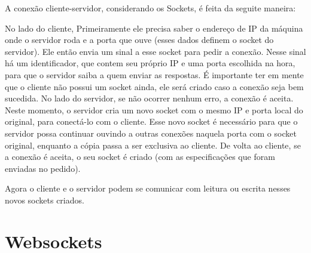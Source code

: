 \documentclass[a4paper,12pt]{article}
\begin{document}
A conexão cliente-servidor, considerando os Sockets, é feita da seguite maneira:

No lado do cliente, Primeiramente ele precisa saber o endereço de IP da máquina onde o servidor roda e a porta que ouve (esses dados definem o socket do servidor). Ele então envia um sinal a esse socket para pedir a conexão. Nesse sinal há um identificador, que contem seu próprio IP e uma porta escolhida na hora, para que o servidor saiba a quem enviar as respostas. É importante ter em mente que o cliente não possui um socket ainda, ele será criado caso a conexão seja bem sucedida.
No lado do servidor, se não ocorrer nenhum erro, a conexão é aceita. Neste momento, o servidor cria um novo socket com o mesmo IP e porta local do original, para conectá-lo com o cliente. Esse novo socket é necessário para que o servidor possa continuar ouvindo a outras conexões naquela porta com o socket original, enquanto a cópia passa a ser exclusiva ao cliente.
De volta ao cliente, se a conexão é aceita, o seu socket é criado (com as especificações que foram enviadas no pedido).

Agora o cliente e o servidor podem se comunicar com leitura ou escrita nesses novos sockets criados.





\section{Websockets}



\end{document}
